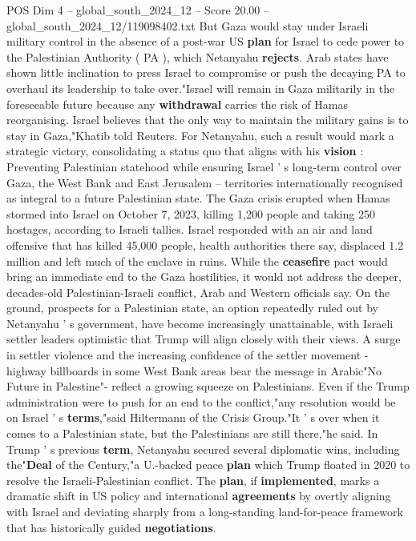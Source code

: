 \begin{textsample}{POS Dim 4 – global\_south\_2024\_12 – Score 20.00 – global\_south\_2024\_12/119098402.txt}
But Gaza would stay under Israeli military control in the absence of a post-war US \textbf{plan} for Israel to cede power to the Palestinian Authority ( PA ), which Netanyahu \textbf{rejects}.
Arab states have shown little inclination to press Israel to compromise or push the decaying PA to overhaul its leadership to take over."Israel will remain in Gaza militarily in the foreseeable future because any \textbf{withdrawal} carries the risk of Hamas reorganising.
Israel believes that the only way to maintain the military gains is to stay in Gaza,"Khatib told Reuters.
For Netanyahu, such a result would mark a strategic victory, consolidating a status quo that aligns with his \textbf{vision} : Preventing Palestinian statehood while ensuring Israel ' s long-term control over Gaza, the West Bank and East Jerusalem -- territories internationally recognised as integral to a future Palestinian state.
The Gaza crisis erupted when Hamas stormed into Israel on October 7, 2023, killing 1,200 people and taking 250 hostages, according to Israeli tallies.
Israel responded with an air and land offensive that has killed 45,000 people, health authorities there say, displaced 1.2 million and left much of the enclave in ruins.
While the \textbf{ceasefire} pact would bring an immediate end to the Gaza hostilities, it would not address the deeper, decades-old Palestinian-Israeli conflict, Arab and Western officials say.
On the ground, prospects for a Palestinian state, an option repeatedly ruled out by Netanyahu ' s government, have become increasingly unattainable, with Israeli settler leaders optimistic that Trump will align closely with their views.
A surge in settler violence and the increasing confidence of the settler movement - highway billboards in some West Bank areas bear the message in Arabic"No Future in Palestine"- reflect a growing squeeze on Palestinians.
Even if the Trump administration were to push for an end to the conflict,"any resolution would be on Israel ' s \textbf{terms},"said Hiltermann of the Crisis Group."It ' s over when it comes to a Palestinian state, but the Palestinians are still there,"he said.
In Trump ' s previous \textbf{term}, Netanyahu secured several diplomatic wins, including the"\textbf{Deal} of the Century,"a U.-backed peace \textbf{plan} which Trump floated in 2020 to resolve the Israeli-Palestinian conflict.
The \textbf{plan}, if \textbf{implemented}, marks a dramatic shift in US policy and international \textbf{agreements} by overtly aligning with Israel and deviating sharply from a long-standing land-for-peace framework that has historically guided \textbf{negotiations}.

\end{textsample}
